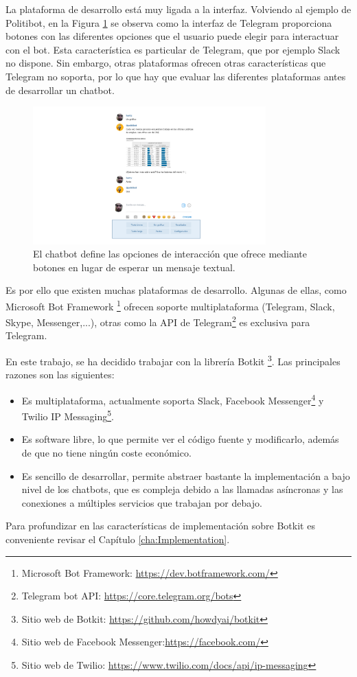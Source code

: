 La plataforma de desarrollo está muy ligada a la interfaz. Volviendo al ejemplo de Politibot, en la Figura \ref{fig:PolitibotBotones} se observa como la interfaz de Telegram proporciona botones con las diferentes opciones que el usuario puede elegir para interactuar con el bot. Esta característica es particular de Telegram, que por ejemplo Slack no dispone. Sin embargo, otras plataformas ofrecen otras características que Telegram no soporta, por lo que hay que evaluar las diferentes plataformas antes de desarrollar un chatbot.
\begin{figure}[htb]
	\centering
	\includegraphics[width=0.8\textwidth]{./figs/PolitibotBotones.png}
	\caption{El chatbot define las opciones de interacción que ofrece mediante botones en lugar de esperar un mensaje textual.}
	\label{fig:PolitibotBotones}
\end{figure}

Es por ello que existen muchas plataformas de desarrollo. Algunas de ellas, como Microsoft Bot Framework \footnote{Microsoft Bot Framework: \url{https://dev.botframework.com/}} ofrecen soporte multiplataforma (Telegram, Slack, Skype, Messenger,...), otras como la API de Telegram\footnote{Telegram bot API: \url{https://core.telegram.org/bots}} es exclusiva para Telegram.

En este trabajo, se ha decidido trabajar con la librería Botkit \footnote{Sitio web de Botkit: \url{https://github.com/howdyai/botkit}}. Las principales razones son las siguientes:
\begin{itemize}
	\item Es multiplataforma, actualmente soporta Slack, Facebook Messenger\footnote{Sitio web de Facebook Messenger:\url{https://facebook.com/}} y Twilio IP Messaging\footnote{Sitio web de Twilio: \url{https://www.twilio.com/docs/api/ip-messaging}}.
	\item Es software libre, lo que permite ver el código fuente y modificarlo, además de que no tiene ningún coste económico.
	\item Es sencillo de desarrollar, permite abstraer bastante la implementación a bajo nivel de los chatbots, que es compleja debido a las llamadas asíncronas y las conexiones a múltiples servicios que trabajan por debajo.
\end{itemize}

Para profundizar en las características de implementación sobre Botkit es conveniente revisar el Capítulo \ref{cha:Implementation}.